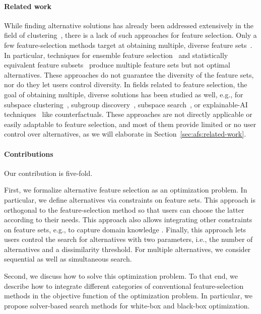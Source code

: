 \documentclass{article}
\theoremstyle{definition}
\begin{document}
\paragraph{Related work}

While finding alternative solutions has already been addressed extensively in the field of clustering~\cite{bailey2014alternative}, there is a lack of such approaches for feature selection.
Only a few feature-selection methods target at obtaining multiple, diverse feature sets~\cite{borboudakis2021extending}.
In particular, techniques for ensemble feature selection~\cite{saeys2008robust, seijo2017ensemble} and statistically equivalent feature subsets~\cite{lagani2017feature} produce multiple feature sets but not optimal alternatives.
These approaches do not guarantee the diversity of the feature sets, nor do they let users control diversity.
In fields related to feature selection, the goal of obtaining multiple, diverse solutions has been studied as well, e.g., for subspace clustering~\cite{hu2018subspace, mueller2009relevant}, subgroup discovery~\cite{leeuwen2012diverse}, subspace search~\cite{trittenbach2019dimension}, or explainable-AI techniques~\cite{artelt2022even, kim2016examples, mothilal2020explaining, russell2019efficient} like counterfactuals.
These approaches are not directly applicable or easily adaptable to feature selection, and most of them provide limited or no user control over alternatives, as we will elaborate in Section~\ref{sec:afs:related-work}.

\paragraph{Contributions}

Our contribution is five-fold.

First, we formalize alternative feature selection as an optimization problem.
In particular, we define alternatives via constraints on feature sets.
This approach is orthogonal to the feature-selection method so that users can choose the latter according to their needs.
This approach also allows integrating other constraints on feature sets, e.g., to capture domain knowledge \cite{bach2022empirical, groves2015toward}.
Finally, this approach lets users control the search for alternatives with two parameters, i.e., the number of alternatives and a dissimilarity threshold.
For multiple alternatives, we consider sequential as well as simultaneous search.

Second, we discuss how to solve this optimization problem.
To that end, we describe how to integrate different categories of conventional feature-selection methods in the objective function of the optimization problem.
In particular, we propose solver-based search methods for white-box and black-box optimization.
\end{document}
